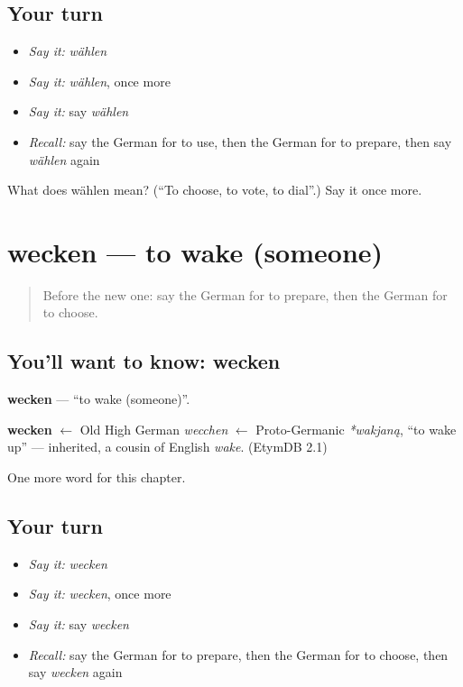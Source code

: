 \subsection*{Your turn}
\begin{itemize}
\raggedright
  \item \emph{Say it:} \emph{wählen}
  \item \emph{Say it:} \emph{wählen}, once more
  \item \emph{Say it:} say \emph{wählen}
  \item \emph{Recall:} say the German for to use, then the German for to prepare, then say \emph{wählen} again
\end{itemize}

\begin{tcolorbox}[breakable,colback=teal!4,colframe=teal!35!black,title={Before you move on}]
What does wählen mean? (\textquotedblleft{}To choose, to vote, to dial\textquotedblright{}.) Say it once more.
\end{tcolorbox}
\section[wecken]{wecken — to wake (someone)}

\label{lesson:GE-C191-wecken}



\begin{quote}
Before the new one: say the German for to prepare, then the German for to choose.
\end{quote}

\subsection*{You'll want to know: wecken}
\textbf{wecken} — \textquotedblleft{}to wake (someone)\textquotedblright{}.

\begin{cousinweb}
\textbf{wecken} $\leftarrow$ Old High German \emph{wecchen} $\leftarrow$ Proto-Germanic \emph{*wakjaną}, \textquotedblleft{}to wake up\textquotedblright{} — inherited, a cousin of English \emph{wake}. (EtymDB 2.1)
\end{cousinweb}

\begin{grammarlens}[title={What you've built}]
One more word for this chapter.
\end{grammarlens}

\subsection*{Your turn}
\begin{itemize}
\raggedright
  \item \emph{Say it:} \emph{wecken}
  \item \emph{Say it:} \emph{wecken}, once more
  \item \emph{Say it:} say \emph{wecken}
  \item \emph{Recall:} say the German for to prepare, then the German for to choose, then say \emph{wecken} again
\end{itemize}

